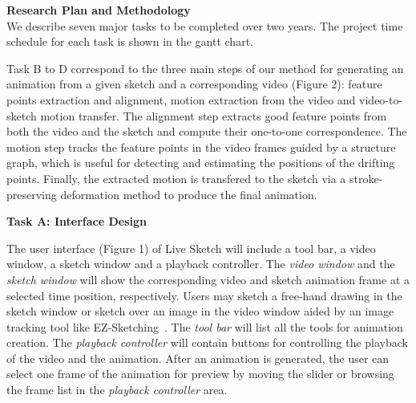 \textbf{Research Plan and Methodology}\\

We describe seven major tasks to be completed over two years. The project time schedule for each task is shown in the gantt chart.

Task B to D correspond to the three main steps of our method for generating an animation from a given sketch and a corresponding video (Figure 2): feature points extraction and alignment, motion extraction from the video and video-to-sketch motion transfer.
{The alignment step extracts good feature points from both the video and the sketch and compute their one-to-one correspondence. The motion step tracks the feature points in the video frames guided by a structure graph, which is useful for detecting and {estimating the positions} of the drifting points. Finally, the extracted motion is transfered to the sketch via a stroke-preserving deformation method to produce the final animation.}

%

\textbf{Task A: Interface Design}

%
The user interface (Figure 1) of Live Sketch will include a tool bar, a video window, a sketch window and a playback controller. 
The {\em video window} and the {\em sketch window} will show the corresponding video and sketch animation frame at a selected time position, respectively. 
Users may sketch a free-hand drawing in the sketch window or sketch over an image in the video window aided by an image tracking tool
like EZ-Sketching~\cite{EZSketching:2014}. 
The {\em tool bar} will list all the tools for animation creation. 
The {\em playback controller} will contain buttons for controlling the playback of the video and 
the animation.
After an animation is generated, the user can select one frame of the animation for preview by moving the slider or browsing the 
frame list in the {\em playback controller} area.

